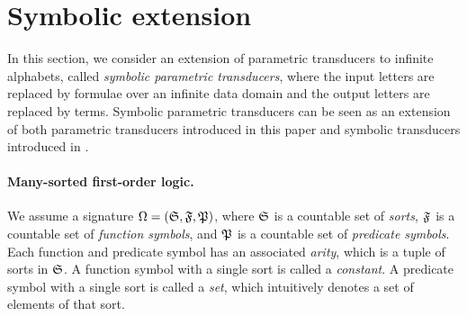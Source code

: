 
\section{Symbolic extension}
\label{sec:symbolic}


In this section, we consider an extension of parametric transducers to infinite alphabets, called \emph{symbolic parametric transducers}, where the input letters are replaced by formulae over an infinite data domain and the output letters are replaced by terms. 
%
Symbolic parametric transducers can be seen as an extension of both parametric transducers introduced in this paper and symbolic transducers introduced in \cite{VHLMB12}.


\paragraph{Many-sorted first-order logic.}
We assume a signature $\Omega=({\mathfrak{S}}, {\mathfrak{F}}, {\mathfrak{P}})$, where ${\mathfrak{S}}$ is a countable set of \emph{sorts}, ${\mathfrak{F}}$ is a countable set of \emph{function symbols}, and ${\mathfrak{P}}$ is a countable set of \emph{predicate symbols}. Each function and predicate symbol has an associated \emph{arity}, which is a tuple of sorts in ${\mathfrak{S}}$.  A function symbol with a single sort is called a \emph{constant}. A predicate symbol with a single sort is called a \emph{set}, which intuitively denotes a set of elements of that sort.

